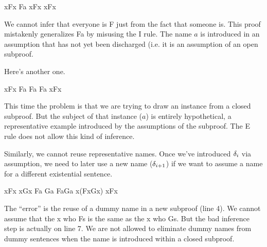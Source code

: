 \begin{fitchproof}
   {\eexists xFx} 
  \open
   {Fa}           
   {\forall xFx}  
  \close
   {\eforall xFx} 
\end{fitchproof}

We cannot infer that everyone is F just from the fact that someone is. This
proof mistakenly generalizes Fa by misusing the \eforall I rule. The name $a$
is introduced in an assumption that has not yet been discharged (i.e. it is an
assumption of an open subproof.

Here's another one.

\begin{fitchproof}
   {\eexists xFx} 
  \open
   {Fa}           
   {Fa}           
  \close
   {Fa}           
   {\eforall xFx} 
\end{fitchproof}

This time the problem is that we are trying to draw an instance from a closed
subproof. But the subject of that instance ($a$) is entirely hypothetical,
a representative example introduced by the assumptions of the subproof. The
\eexists E rule does not allow this kind of inference.

Similarly, we cannot reuse representative names. Once we've introduced
$\delta_i$ via assumption, we need to later use a new name ($\delta_{i+1}$) if
we want to assume a name for a different existential sentence.

\begin{fitchproof}
   {\eexists xFx}           
   {\eexists xGx}           
  \open
   {Fa}                     
  \open
   {Ga}                     
   {Fa\eand Ga}             
   {}
  \close
   {\eexists x(Fx\eand Gx)} 
  \close
   {\eforall xFx}           
\end{fitchproof}

The ``error'' is the reuse of a dummy name in a new subproof (line 4). We cannot
assume that the x who Fs is the same as the x who Gs. But the bad inference step
is actually on line 7. We are not allowed to eliminate dummy names from dummy
sentences when the name is introduced within a closed subproof.

